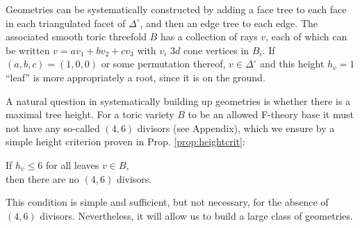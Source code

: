 \documentclass[aps,prl,twocolumn, superscriptaddress,groupedaddress,nofootinbib]{revtex4-1}
\begin{document}
Geometries can be systematically constructed by adding a face tree to each face in each triangulated facet of $\Delta^\circ$, and then an edge tree to each edge. The associated smooth toric
threefold $B$ has a collection of rays $v$, each of which can be written $v=av_1+bv_2+cv_3$ with $v_i$ $3d$ cone vertices in $B_i$. If $(a,b,c)=(1,0,0)$ or some
permutation thereof, $v\in \Delta^\circ$ and this height $h_v=1$ ``leaf'' is more
appropriately a root, since it is on the ground.

A natural question
in systematically building up geometries is whether there is
a maximal tree height. For a toric variety $B$ to be an allowed
F-theory base it must not have any so-called $(4,6)$ divisors (see Appendix), which
we ensure by a simple height criterion proven in Prop. \ref{prop:heightcrit}:
\begin{center}
If $h_v\leq 6$ for all leaves $v\in B$, \\ then there are no $(4,6)$
divisors.
\end{center}
This condition is simple and sufficient, but not necessary,
for the absence of $(4,6)$ divisors. Nevertheless, it
will allow us to build a large class of geometries.
\end{document}
